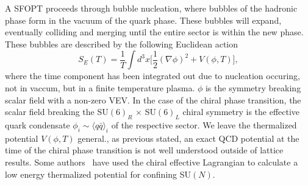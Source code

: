 \documentclass[nofootinbib,twocolumn,preprintnumbers]{revtex4-1}
\begin{document}
A SFOPT proceeds through bubble nucleation, where bubbles of the hadronic phase form in the vacuum of the quark phase. These bubbles will expand, eventually colliding and merging until the entire sector is within the new phase.  These bubbles are described by the following Euclidean action~\cite{Linde:1981zj}
%
\begin{equation}\label{eqn:EuclideanAction}
S_{E}(T) = \frac{1}{T}\int d^3x \bigg[\frac{1}{2}(\nabla\phi)^2 + V(\phi,T)  \bigg],
\end{equation}
where the time component has been integrated out due to nucleation occuring, not in vaccum, but in a finite temperature plasma. $\phi$ is the symmetry breaking scalar field with a non-zero VEV. In the case of the chiral phase transition, the scalar field breaking the SU$(6)_{R}$ $ \times$ SU$(6)_{L}$ chiral symmetry is the effective quark condensate $\phi_{i} \sim \langle q\bar{q} \rangle_{i}$ of the respective sector. We leave the thermalized potential $V(\phi, T)$ general., as previous stated, an exact QCD potential at the time of the chiral phase transition is not well understood outside of lattice results. Some authors~\cite{Bai:2018dxf} have used the chiral effective Lagrangian to calculate a low energy thermalized potential for confining SU$(N)$. 
\end{document}
